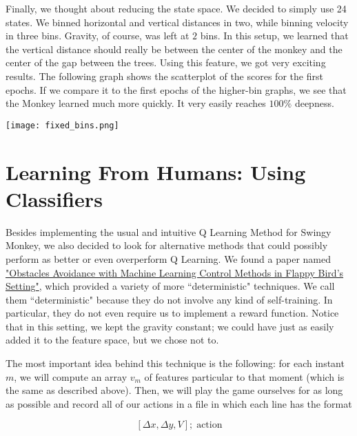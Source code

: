 \documentclass[10pt]{article}
\begin{document}
\medskip

Finally, we thought about reducing the state space. We decided to simply use
24 states. We binned horizontal and vertical distances in two, while binning
velocity in three bins. Gravity, of course, was left at $2$ bins. In this 
setup, we learned that the vertical distance should really be between the
center of the monkey and the center of the gap between the trees. Using this
feature, we got very exciting results. The following graph shows the scatterplot
of the scores for the first epochs. If we compare it to the first epochs of the
higher-bin graphs, we see that the Monkey learned much more quickly. It very
easily reaches $100\%$ deepness.

\medskip

\begin{center}
\texttt{[image: fixed\_bins.png]}
\end{center}

\medskip

\section{Learning From Humans: Using Classifiers}

Besides implementing the usual and intuitive Q Learning Method for Swingy Monkey, 
we also decided to look for alternative methods that could possibly perform as 
better or even overperform Q Learning. We found a paper named \href{https://github.com/jereliu/Swingy-Monkey-AI/blob/master/Reference/Example\%20Work/Flappy\%20Birds.pdf}{"Obstacles Avoidance 
with Machine Learning Control Methods in Flappy Bird's Setting"}, which provided a 
variety of more ``deterministic" techniques. We call them ``deterministic" because
they do not involve any kind of self-training. In particular, they do not even 
require us to implement a reward function. Notice that in this setting,
we kept the gravity constant; we could have just as easily added it to the
feature space, but we chose not to.

\medskip

The most important idea behind this technique is the following: for each instant 
$m$, we will compute an array $v_m$ of features particular to that moment (which
is the same as described above). Then, we will play the game ourselves for as 
long as possible and record all of our actions in a file in which each line has the format 

\[ [\Delta x, \Delta y, V]; \; \text{action} \]
\end{document}
